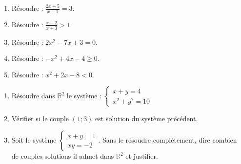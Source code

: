 \documentclass[11pt]{article}
\begin{document}
\begin{exercice}
\begin{enumerate}
    \item Résoudre : $\frac{2x+5}{x-1}=3$.
    \item Résoudre : $\frac{x-2}{x+3} > 1$.
    \item Résoudre : $2x^2-7x+3=0$.
    \item Résoudre : $-x^2+4x-4 \geq 0$.
    \item Résoudre : $x^2+2x-8 < 0$.
\end{enumerate}
\end{exercice}

\begin{exercice}
\begin{enumerate}
    \item Résoudre dans $\mathbb{R}^2$ le système :
    $\left\{\begin{array}{l} x+y=4 \\ x^2+y^2=10 \end{array}\right.$
    \item Vérifier si le couple $(1; 3)$ est solution du système précédent.
    \item Soit le système $\left\{\begin{array}{l} x+y=1 \\ xy=-2 \end{array}\right.$. Sans le résoudre complètement, dire combien de couples solutions il admet dans $\mathbb{R}^2$ et justifier.
\end{enumerate}
\end{exercice}
\end{document}
